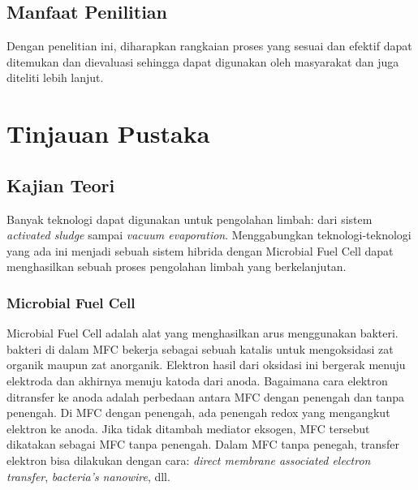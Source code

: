 \documentclass[10pt,a4paper,hidelinks]{article}
\begin{document}
	\subsection{Manfaat Penilitian}
	Dengan penelitian ini, diharapkan rangkaian proses yang sesuai dan efektif dapat ditemukan dan dievaluasi sehingga dapat digunakan oleh masyarakat dan juga diteliti lebih lanjut.
	\section{Tinjauan Pustaka}
    \subsection{Kajian Teori}
    Banyak teknologi dapat digunakan untuk pengolahan limbah: dari sistem  \textit{activated sludge} sampai \textit{vacuum evaporation}. Menggabungkan teknologi-teknologi yang ada ini menjadi sebuah sistem hibrida dengan Microbial Fuel Cell dapat menghasilkan sebuah proses pengolahan limbah yang berkelanjutan.
    \subsubsection{Microbial Fuel Cell}
    Microbial Fuel Cell adalah alat yang menghasilkan arus menggunakan bakteri. bakteri di dalam MFC bekerja sebagai sebuah katalis untuk mengoksidasi zat organik maupun zat anorganik. Elektron hasil dari oksidasi ini bergerak menuju elektroda dan akhirnya menuju katoda dari anoda. Bagaimana cara elektron ditransfer ke anoda adalah perbedaan antara MFC dengan penengah dan tanpa penengah. Di MFC dengan penengah, ada penengah redox yang mengangkut elektron ke anoda. Jika tidak ditambah mediator eksogen, MFC tersebut dikatakan sebagai MFC tanpa penengah. Dalam MFC tanpa penegah, transfer elektron bisa dilakukan dengan cara: \textit{direct membrane associated electron transfer}, \textit{bacteria's nanowire}, dll. 
\end{document}

